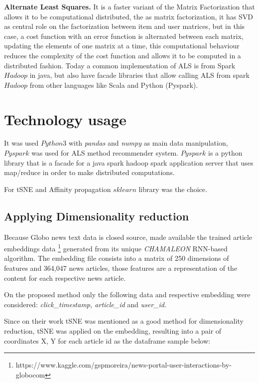 \documentclass[ecp,tc,english]{iiufrgs}
\begin{document}
    
    \textbf{Alternate Least Squares.} It is a faster variant of the Matrix Factorization that allows it to be computational distributed, the as matrix factorization, it has SVD as central role on the factorization between item and user matrices, but in this case, a cost function with an error function is alternated between each matrix, updating the elements of one matrix at a time, this computational behaviour reduces the complexity of the cost function and allows it to be computed in a distributed fashion.
    Today a common implementation of ALS is from Spark \(Hadoop\) in java, but also have facade libraries that allow calling ALS from spark \(Hadoop\) from other languages like Scala and Python (Pyspark).

    \section{Technology usage}

    It was used \(Python3\) with \textit{pandas} \cite{reback2020pandas} and \textit{numpy} as main data manipulation, \(Pyspark\) was used for ALS method recommender system. 
    \(Pyspark\) is a python library that is a facade for a java spark hadoop spark application server that uses map/reduce in order to make distributed computations.

    For tSNE and Affinity propagation \(sklearn\) library was the choice.
        
        \subsection{Applying Dimensionality reduction}
        Because Globo news text data is closed source, \cite{deSouzaPereiraMoreira:2018:CDL:3240323.3240331} made available the trained article embeddings data \footnote{https://www.kaggle.com/gspmoreira/news-portal-user-interactions-by-globocom} generated from its unique \textit{CHAMALEON} RNN-based algorithm. The embedding file consists into a matrix of 250 dimensions of features and 364,047 news articles, those features are a representation of the content for each respective news article.
    
        On the proposed method only the following data and respective embedding were considered: \textit{click\_timestamp, article\_id} and \textit{{}user\_id}.
        
    
        Since on their work tSNE was mentioned as a good method for dimensionality reduction, tSNE was applied on the embedding, resulting into a pair of coordinates X, Y for each article id as the dataframe sample below:
        
\end{document}
